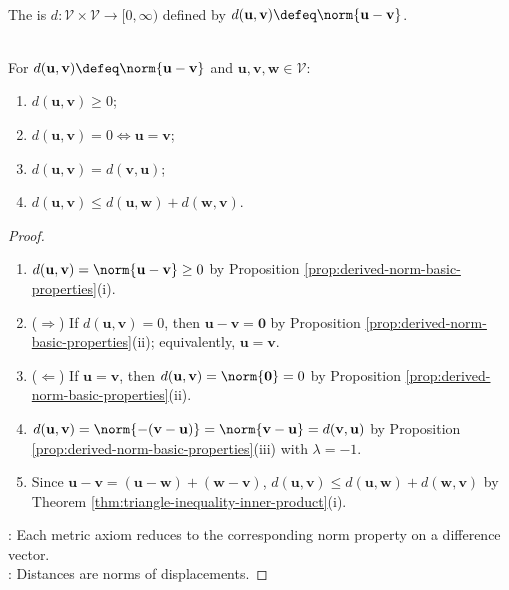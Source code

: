 \begin{definition} \label{def:inner-product-distance} \\
The  is $d:\mathcal{V}\times\mathcal{V}\to[0,\infty)$ defined by $d(\mathbf{u},\mathbf{v})\defeq\norm{\mathbf{u}-\mathbf{v}}$.
\end{definition}

\begin{proposition} \label{prop:inner-product-distance-is-metric} \\
For $d(\mathbf{u},\mathbf{v})\defeq\norm{\mathbf{u}-\mathbf{v}}$ and $\mathbf{u},\mathbf{v},\mathbf{w}\in\mathcal{V}$:
\begin{enumerate}[label=(\roman*)]
\setlength{\itemsep}{0pt}
\item $d(\mathbf{u},\mathbf{v})\geq0$;
\item $d(\mathbf{u},\mathbf{v})=0\Longleftrightarrow\mathbf{u}=\mathbf{v}$;
\item $d(\mathbf{u},\mathbf{v})=d(\mathbf{v},\mathbf{u})$;
\item $d(\mathbf{u},\mathbf{v})\leq d(\mathbf{u},\mathbf{w})+d(\mathbf{w},\mathbf{v})$.
\end{enumerate}
\begin{proof}
\begin{enumerate}[label=(\roman*)]
\setlength{\itemsep}{0pt}
\item[$(i)$] $d(\mathbf{u},\mathbf{v})=\norm{\mathbf{u}-\mathbf{v}}\geq0$ by Proposition \ref{prop:derived-norm-basic-properties}(i).
\item[$(ii)$] ($\Rightarrow$) If $d(\mathbf{u},\mathbf{v})=0$, then $\mathbf{u}-\mathbf{v}=\mathbf{0}$ by Proposition \ref{prop:derived-norm-basic-properties}(ii); equivalently, $\mathbf{u}=\mathbf{v}$.
\item[$(ii)$] ($\Leftarrow$) If $\mathbf{u}=\mathbf{v}$, then $d(\mathbf{u},\mathbf{v})=\norm{\mathbf{0}}=0$ by Proposition \ref{prop:derived-norm-basic-properties}(ii).
\item[$(iii)$] $d(\mathbf{u},\mathbf{v})=\norm{-(\mathbf{v}-\mathbf{u})}=\norm{\mathbf{v}-\mathbf{u}}=d(\mathbf{v},\mathbf{u})$ by Proposition \ref{prop:derived-norm-basic-properties}(iii) with $\lambda=-1$.
\item[$(iv)$] Since $\mathbf{u}-\mathbf{v}=(\mathbf{u}-\mathbf{w})+(\mathbf{w}-\mathbf{v})$, $d(\mathbf{u},\mathbf{v})\leq d(\mathbf{u},\mathbf{w})+d(\mathbf{w},\mathbf{v})$ by Theorem \ref{thm:triangle-inequality-inner-product}(i).
\end{enumerate}
: Each metric axiom reduces to the corresponding norm property on a difference vector.\\
: Distances are norms of displacements.
\end{proof}
\end{proposition}

